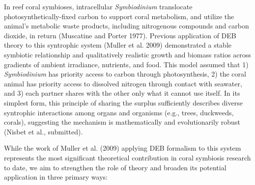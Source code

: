 \documentclass[]{elsarticle} %
\begin{document}
In reef coral symbioses, intracellular \emph{Symbiodinium} translocate
photosynthetically-fixed carbon to support coral metabolism, and utilize
the animal's metabolic waste products, including nitrogenous compounds
and carbon dioxide, in return (Muscatine and Porter 1977). Previous
application of DEB theory to this syntrophic system (Muller et al. 2009)
demonstrated a stable symbiotic relationship and qualitatively realistic
growth and biomass ratios across gradients of ambient irradiance,
nutrients, and food. This model assumed that 1) \emph{Symbiodinium} has
priority access to carbon through photosynthesis, 2) the coral animal
has priority access to dissolved nitrogen through contact with seawater,
and 3) each partner shares with the other only what it cannot use
itself. In its simplest form, this principle of sharing the surplus
sufficiently describes diverse syntrophic interactions among organs and
organisms (e.g., trees, duckweeds, corals), suggesting the mechanism is
mathematically and evolutionarily robust (Nisbet et al., submitted).

While the work of Muller et al. (2009) applying DEB formalism to this
system represents the most significant theoretical contribution in coral
symbiosis research to date, we aim to strengthen the role of theory and
broaden its potential application in three primary ways:
\end{document}
